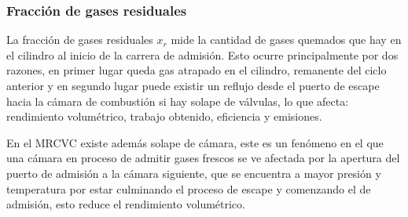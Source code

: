 
\subsubsection{Fracción de gases residuales}
%
La fracción de gases residuales $x_r$ mide la cantidad de gases quemados que
hay en el cilindro al inicio de la carrera de admisión.
%
Esto ocurre principalmente por dos razones, en primer lugar queda gas atrapado
en el cilindro, remanente del ciclo anterior y en segundo lugar puede existir
un reflujo desde el puerto de escape hacia la cámara de combustión si hay
solape de válvulas, lo que afecta: rendimiento volumétrico, trabajo obtenido,
eficiencia y emisiones.

En el MRCVC existe además solape de cámara, este es un fenómeno en el que una
cámara en proceso de admitir gases frescos se ve afectada por la apertura del
puerto de admisión a la cámara siguiente, que se encuentra a mayor presión y
temperatura por estar culminando el proceso de escape y comenzando el de
admisión, esto reduce el rendimiento volumétrico.
%
